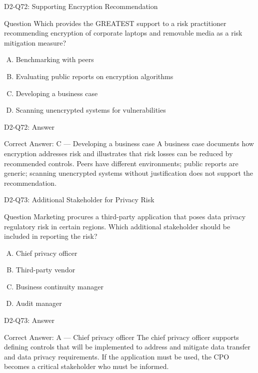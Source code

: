 \documentclass{beamer}
\begin{document}
	\begin{frame}{D2-Q72: Supporting Encryption Recommendation}
		\begin{block}{Question}
			Which provides the GREATEST support to a risk practitioner recommending encryption of corporate laptops and removable media as a risk mitigation measure?
		\end{block}
		\begin{enumerate}[(A)]
			\item Benchmarking with peers
			\item Evaluating public reports on encryption algorithms
			\item Developing a business case
			\item Scanning unencrypted systems for vulnerabilities
		\end{enumerate}
	\end{frame}
	\begin{frame}{D2-Q72: Answer}
		\begin{block}{Correct Answer: C --- Developing a business case}
			A business case documents how encryption addresses risk and illustrates that risk losses can be reduced by recommended controls. Peers have different environments; public reports are generic; scanning unencrypted systems without justification does not support the recommendation.
		\end{block}
	\end{frame}
	
	\begin{frame}{D2-Q73: Additional Stakeholder for Privacy Risk}
		\begin{block}{Question}
			Marketing procures a third-party application that poses data privacy regulatory risk in certain regions. Which additional stakeholder should be included in reporting the risk?
		\end{block}
		\begin{enumerate}[(A)]
			\item Chief privacy officer
			\item Third-party vendor
			\item Business continuity manager
			\item Audit manager
		\end{enumerate}
	\end{frame}
	\begin{frame}{D2-Q73: Answer}
		\begin{block}{Correct Answer: A --- Chief privacy officer}
			The chief privacy officer supports defining controls that will be implemented to address and mitigate data transfer and data privacy requirements. If the application must be used, the CPO becomes a critical stakeholder who must be informed.
		\end{block}
	\end{frame}
	
\end{document}
